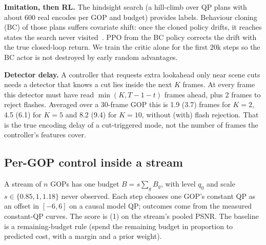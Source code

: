 \documentclass[conference]{IEEEtran}
\begin{document}
\textbf{Imitation, then RL.} The hindsight search (a hill-climb over QP plans with about 600 real encodes per GOP and budget) provides labels. Behaviour cloning (BC) of those plans suffers covariate shift: once the cloned policy drifts, it reaches states the search never visited~\cite{ross2011dagger}. PPO from the BC policy corrects the drift with the true closed-loop return. We train the critic alone for the first 20k steps so the BC actor is not destroyed by early random advantages.

\textbf{Detector delay.} A controller that requests extra lookahead only near scene cuts needs a detector that knows a cut lies inside the next $K$ frames. At every frame this detector must have read $\min(K, T{-}1{-}t)$ frames ahead, plus 2 frames to reject flashes. Averaged over a 30-frame GOP this is 1.9 (3.7) frames for $K{=}2$, 4.5 (6.1) for $K{=}5$ and 8.2 (9.4) for $K{=}10$, without (with) flash rejection. That is the true encoding delay of a cut-triggered mode, not the number of frames the controller's features cover.

\subsection{Per-GOP control inside a stream}
A stream of $n$ GOPs has one budget $B = s\sum_g B_g$, with level $q_0$ and scale $s\in\{0.85,1,1.18\}$ never observed. Each step chooses one GOP's constant QP as an offset in $[-6,6]$ on a causal model QP; outcomes come from the measured constant-QP curves. The score is (1) on the stream's pooled PSNR. The baseline is a remaining-budget rule (spend the remaining budget in proportion to predicted cost, with a margin and a prior weight).
\end{document}
